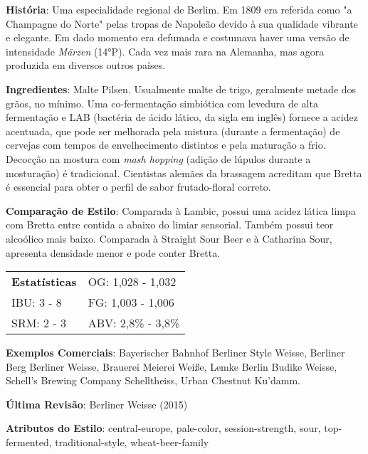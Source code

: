 \textbf{História}: Uma especialidade regional de Berlim. Em 1809 era referida como "a Champagne do Norte" pelas tropas de Napoleão devido à sua qualidade vibrante e elegante. Em dado momento era defumada e costumava haver uma versão de intensidade \textit{Märzen} (14°P). Cada vez mais rara na Alemanha, mas agora produzida em diversos outros países.

\textbf{Ingredientes}: Malte Pilsen. Usualmente malte de trigo, geralmente metade dos grãos, no mínimo. Uma co-fermentação simbiótica com levedura de alta fermentação e LAB (bactéria de ácido lático, da sigla em inglês) fornece a acidez acentuada, que pode ser melhorada pela mistura (durante a fermentação) de cervejas com tempos de envelhecimento distintos e pela maturação a frio. Decocção na mostura com \textit{mash hopping} (adição de lúpulos durante a mosturação) é tradicional. Cientistas alemães da brassagem acreditam que Bretta é essencial para obter o perfil de sabor frutado-floral correto.

\textbf{Comparação de Estilo}: Comparada à Lambic, possui uma acidez lática limpa com Bretta entre contida a abaixo do limiar sensorial. Também possui teor alcoólico mais baixo. Comparada à Straight Sour Beer e à Catharina Sour, apresenta densidade menor e pode conter Bretta.

\begin{tabular}{@{}p{35mm}p{35mm}@{}}
  \textbf{Estatísticas} & OG: 1,028 - 1,032 \\
  IBU: 3 - 8  & FG: 1,003 - 1,006  \\
  SRM: 2 - 3  & ABV: 2,8\% - 3,8\%
\end{tabular}

\textbf{Exemplos Comerciais}: Bayerischer Bahnhof Berliner Style Weisse, Berliner Berg Berliner Weisse, Brauerei Meierei Weiße, Lemke Berlin Budike Weisse, Schell's Brewing Company Schelltheiss, Urban Chestnut Ku’damm.

\textbf{Última Revisão}: Berliner Weisse (2015)

\textbf{Atributos do Estilo}: central-europe, pale-color, session-strength, sour, top-fermented, traditional-style, wheat-beer-family
